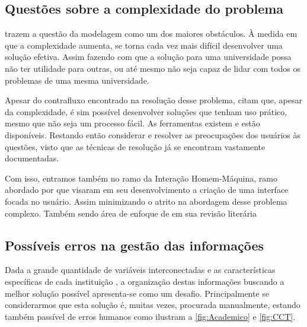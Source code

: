 \subsection{Questões sobre a complexidade do problema} \label{ssec:desafios}                                                      %


 trazem a questão da modelagem como um dos maiores obstáculos. À medida em que a complexidade aumenta, se torna cada vez mais difícil desenvolver uma solução efetiva. Assim fazendo com que a solução para uma universidade possa não ter utilidade para outras, ou até mesmo não seja capaz de lidar com todos os problemas de uma mesma universidade.

Apesar do contrafluxo encontrado na resolução desse problema,  citam que, apesar da complexidade, é sim possível desenvolver soluções que tenham uso prático, mesmo que não seja um processo fácil. As ferramentas existem e estão disponíveis. Restando então considerar e resolver as preocupações dos usuários às questões, visto que as técnicas de resolução já se encontram vastamente documentadas.

Com isso, entramos também no ramo da Interação Homem-Máquina, ramo abordado por  que visaram em seu desenvolvimento a criação de uma interface focada no usuário. Assim minimizando o atrito na abordagem desse problema complexo. Também sendo área de enfoque de  em sua revisão literária

\subsection{Possíveis erros na gestão das informações} \label{ssec:erros}                                                    %

Dada a grande quantidade de variáveis interconectadas e as características específicas de cada instituição \cite{Miranda2012}, a organização destas informações buscando a melhor solução possível apresenta-se como um desafio. Principalmente se considerarmos que esta solução é, muitas vezes, procurada manualmente, estando também passível de erros humanos como ilustram a \autoref{fig:Academico} e \autoref{fig:CCT}.

